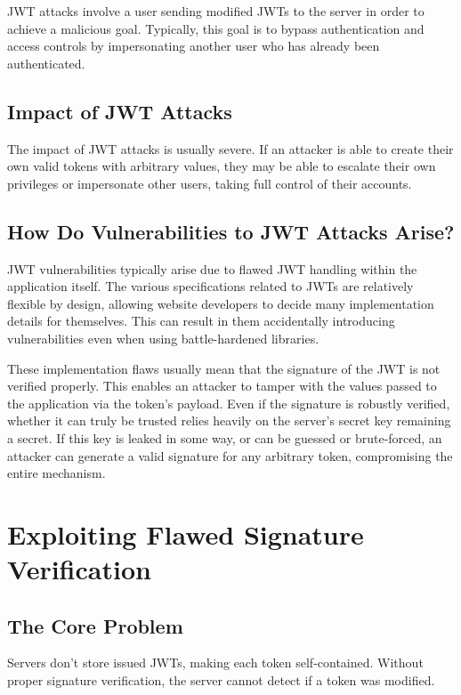 \documentclass{article}
\begin{document}
JWT attacks involve a user sending modified JWTs to the server in order to achieve a 
malicious goal. Typically, this goal is to bypass authentication and access controls 
by impersonating another user who has already been authenticated.

\subsection{Impact of JWT Attacks}

The impact of JWT attacks is usually severe. If an attacker is able to create their 
own valid tokens with arbitrary values, they may be able to escalate their own 
privileges or impersonate other users, taking full control of their accounts.

\subsection{How Do Vulnerabilities to JWT Attacks Arise?}

JWT vulnerabilities typically arise due to flawed JWT handling within the application 
itself. The various specifications related to JWTs are relatively flexible by design, 
allowing website developers to decide many implementation details for themselves. This 
can result in them accidentally introducing vulnerabilities even when using battle-hardened 
libraries.

These implementation flaws usually mean that the signature of the JWT is not verified 
properly. This enables an attacker to tamper with the values passed to the application 
via the token's payload. Even if the signature is robustly verified, whether it can truly 
be trusted relies heavily on the server's secret key remaining a secret. If this key is 
leaked in some way, or can be guessed or brute-forced, an attacker can generate a valid 
signature for any arbitrary token, compromising the entire mechanism.

\section{Exploiting Flawed Signature Verification}

\subsection{The Core Problem}

Servers don't store issued JWTs, making each token self-contained. Without proper signature 
verification, the server cannot detect if a token was modified.
\end{document}
